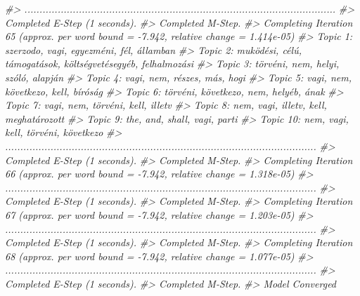 \documentclass[
]{book}
\newenvironment{Shaded}{\begin{snugshade}}{\end{snugshade}}
\newcommand{\CommentTok}[1]{\textcolor[rgb]{0.56,0.35,0.01}{\textit{#1}}}
\begin{document}
\begin{Shaded}
\begin{Highlighting}[]
\CommentTok{\#\textgreater{} .......................................................................................................}
\CommentTok{\#\textgreater{} Completed E{-}Step (1 seconds). }
\CommentTok{\#\textgreater{} Completed M{-}Step. }
\CommentTok{\#\textgreater{} Completing Iteration 65 (approx. per word bound = {-}7.942, relative change = 1.414e{-}05) }
\CommentTok{\#\textgreater{} Topic 1: szerzodo, vagi, egyezméni, fél, államban }
\CommentTok{\#\textgreater{}  Topic 2: muködési, célú, támogatások, költségvetésegyéb, felhalmozási }
\CommentTok{\#\textgreater{}  Topic 3: törvéni, nem, helyi, szóló, alapján }
\CommentTok{\#\textgreater{}  Topic 4: vagi, nem, részes, más, hogi }
\CommentTok{\#\textgreater{}  Topic 5: vagi, nem, következo, kell, bíróság }
\CommentTok{\#\textgreater{}  Topic 6: törvéni, következo, nem, helyéb, ának }
\CommentTok{\#\textgreater{}  Topic 7: vagi, nem, törvéni, kell, illetv }
\CommentTok{\#\textgreater{}  Topic 8: nem, vagi, illetv, kell, meghatározott }
\CommentTok{\#\textgreater{}  Topic 9: the, and, shall, vagi, parti }
\CommentTok{\#\textgreater{}  Topic 10: nem, vagi, kell, törvéni, következo }
\CommentTok{\#\textgreater{} .......................................................................................................}
\CommentTok{\#\textgreater{} Completed E{-}Step (1 seconds). }
\CommentTok{\#\textgreater{} Completed M{-}Step. }
\CommentTok{\#\textgreater{} Completing Iteration 66 (approx. per word bound = {-}7.942, relative change = 1.318e{-}05) }
\CommentTok{\#\textgreater{} .......................................................................................................}
\CommentTok{\#\textgreater{} Completed E{-}Step (1 seconds). }
\CommentTok{\#\textgreater{} Completed M{-}Step. }
\CommentTok{\#\textgreater{} Completing Iteration 67 (approx. per word bound = {-}7.942, relative change = 1.203e{-}05) }
\CommentTok{\#\textgreater{} .......................................................................................................}
\CommentTok{\#\textgreater{} Completed E{-}Step (1 seconds). }
\CommentTok{\#\textgreater{} Completed M{-}Step. }
\CommentTok{\#\textgreater{} Completing Iteration 68 (approx. per word bound = {-}7.942, relative change = 1.077e{-}05) }
\CommentTok{\#\textgreater{} .......................................................................................................}
\CommentTok{\#\textgreater{} Completed E{-}Step (1 seconds). }
\CommentTok{\#\textgreater{} Completed M{-}Step. }
\CommentTok{\#\textgreater{} Model Converged}
\end{Highlighting}
\end{Shaded}
\end{document}
